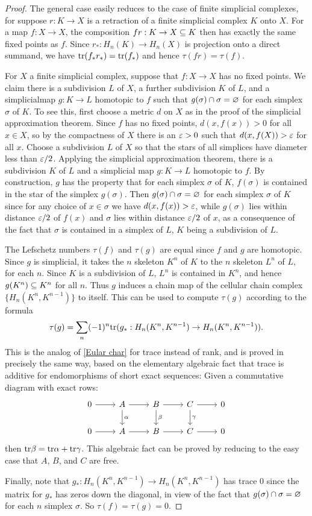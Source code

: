 \begin{proof}
The general case easily reduces to the case of finite simplicial complexes,
for suppose $r:K\to X$ is a retraction of a finite simplicial complex $K$ onto $X$. For a map $f:X\to X$, the composition $fr:K\to X\subseteq K$ then has exactly the same fixed points as $f$. Since $r_*:H_n(K)\to H_n(X)$ is projection onto a direct summand, we have $\mathrm{tr}(f_*r_*)=\mathrm{tr}(f_*)$ and hence $\tau(fr)=\tau(f)$.\par
For $X$ a finite simplicial complex, suppose that $f:X\to X$ has no fixed points. We claim there is a subdivision $L$ of $X$, a further subdivision $K$ of $L$, and a simplicialmap $g:K\to L$ homotopic to $f$ such that $g(\sigma)\cap\sigma=\varnothing$ for each simplex $\sigma$ of $K$. To see this, first choose a metric $d$ on $X$ as in the proof of the simplicial approximation theorem. Since $f$ has no fixed points, $d(x,f(x))>0$ for all $x\in X$, so by the compactness of $X$ there is an $\varepsilon>0$ such that $d(x,f(X))>\varepsilon$ for all $x$. Choose a subdivision $L$ of $X$ so that the stars of all simplices have diameter less than $\varepsilon/2$. Applying the simplicial approximation theorem, there is a subdivision $K$ of $L$ and a simplicial map $g:K\to L$ homotopic to $f$. By construction, $g$ has the property that for each simplex $\sigma$ of $K$, $f(\sigma)$ is contained in the star of the simplex $g(\sigma)$. Then $g(\sigma)\cap\sigma=\varnothing$ for each simplex $\sigma$ of $K$ since for any choice of $x\in\sigma$ we have $d(x,f(x))>\varepsilon$, while $g(\sigma)$ lies within distance $\varepsilon/2$ of $f(x)$ and $\sigma$ lies within distance $\varepsilon/2$ of $x$, as a consequence of the fact that $\sigma$ is contained in a simplex of $L$, $K$ being a subdivision of $L$.\par
The Lefschetz numbers $\tau(f)$ and $\tau(g)$ are equal since $f$ and $g$ are homotopic. Since $g$ is simplicial, it takes the $n$ skeleton $K^n$ of $K$ to the $n$ skeleton $L^n$ of $L$, for each $n$. Since $K$ is a subdivision of $L$, $L^n$ is contained in $K^n$, and hence $g(K^n)\subseteq K^n$ for all $n$. Thus $g$ induces a chain map of the cellular chain complex $\{H_n(K^n,K^{n-1})\}$ to itself. This can be used to compute $\tau(g)$ according to the formula
\[\tau(g)=\sum_n(-1)^n\mathrm{tr}(g_*:H_n(K^n,K^{n-1})\to H_n(K^n,K^{n-1})).\]
This is the analog of \cref{Eular char} for trace instead of rank, and is proved in precisely the same way, based on the elementary algebraic fact that trace is additive for endomorphisms of short exact sequences: Given a commutative diagram with exact rows:
\[\begin{tikzcd}
0\ar[r]&A\ar[r]\ar[d,"\alpha"]&B\ar[r]\ar[d,"\beta"]&C\ar[r]\ar[d,"\gamma"]&0\\
0\ar[r]&A\ar[r]&B\ar[r]&C\ar[r]&0
\end{tikzcd}\] then $\mathrm{tr}\beta=\mathrm{tr}\alpha+\mathrm{tr}\gamma$. This algebraic fact can be
proved by reducing to the easy case that $A$, $B$, and $C$ are free.\par
Finally, note that $g_*:H_n(K^n,K^{n-1})\to H_n(K^n,K^{n-1})$ has trace $0$ since the matrix for $g_*$ has zeros down the diagonal, in view of the fact that $g(\sigma)\cap\sigma=\varnothing$ for each $n$ simplex $\sigma$. So $\tau(f)=\tau(g)=0$.
\end{proof}
